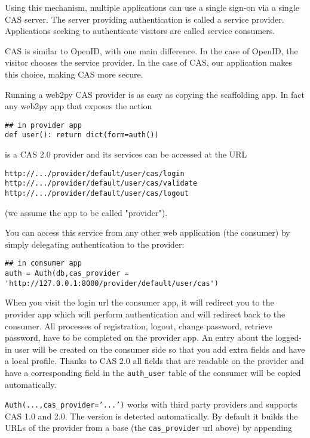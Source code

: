 \documentclass[justified,sixbynine,notoc]{tufte-book}
\def\ft{\small\tt}
\begin{document}
\begin{fullwidth}
Using this mechanism, multiple applications can use a single sign-on via a single CAS server. The server providing authentication is called a service provider. Applications seeking to authenticate visitors are called service consumers.

CAS is similar to OpenID, with one main difference. In the case of OpenID, the visitor chooses the service provider. In the case of CAS, our application makes this choice, making CAS more secure.

Running a web2py CAS provider is as easy as copying the scaffolding app. In fact any web2py app that exposes the action

\begin{lstlisting}
## in provider app
def user(): return dict(form=auth())
\end{lstlisting}
\noindent is a CAS 2.0 provider and its services can be accessed at the URL

\begin{lstlisting}[keywords={}]
http://.../provider/default/user/cas/login
http://.../provider/default/user/cas/validate
http://.../provider/default/user/cas/logout
\end{lstlisting}
(we assume the app to be called "provider").

You can access this service from any other web application (the consumer) by simply delegating authentication to the provider:

\begin{lstlisting}
## in consumer app
auth = Auth(db,cas_provider = 'http://127.0.0.1:8000/provider/default/user/cas')
\end{lstlisting}

When you visit the login url the consumer app, it will redirect you to the provider app which will perform authentication and will redirect back to the consumer. All processes of registration, logout, change password, retrieve password, have to be completed on the provider app. An entry about the logged-in user will be created on the consumer side so that you add extra fields and have a local profile. Thanks to CAS 2.0 all fields that are readable on the provider and have a corresponding field in the {\ft auth\_user} table of the consumer will be copied automatically.

{\ft Auth(...,cas\_provider='...')} works with third party providers and supports CAS 1.0 and 2.0. The version is detected automatically. By default it builds the URLs of the provider from a base (the {\ft cas\_provider} url above) by appending


\end{fullwidth}
\end{document}

